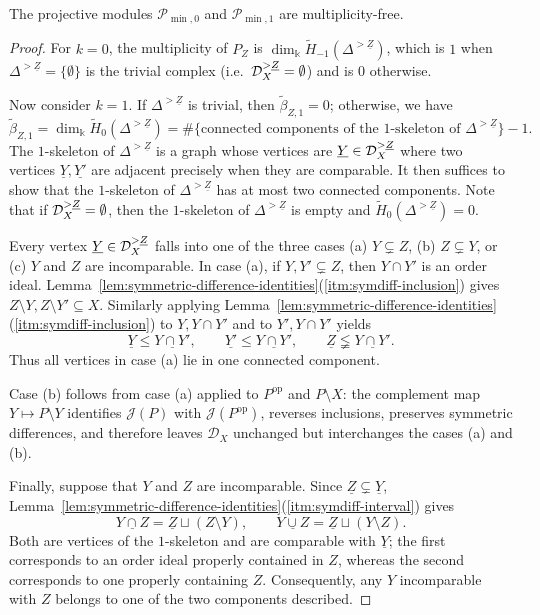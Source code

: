 \documentclass[a4paper,leqno]{amsart}
\begin{document}
\begin{prop}\label{prop:low-degree-multiplicity}
The projective modules $\mathcal P_{\min,0}$ and $\mathcal P_{\min,1}$ are multiplicity-free.
\end{prop}

\begin{proof}
For $k=0$, the multiplicity of $P_Z$ is $\dim_{\Bbbk}\widetilde H_{-1}(\Delta^{>\underline{Z}})$, which is $1$ when $\Delta^{>\underline{Z}}=\{\emptyset\}$ is the trivial complex (i.e.\ $\mathcal D_X^{>\underline{Z}}=\emptyset$) and is $0$ otherwise.

Now consider $k=1$. If $\Delta^{>\underline{Z}}$ is trivial, then $\widetilde\beta_{Z,1}=0$; otherwise, we have
\begin{equation*}
 \widetilde\beta_{Z,1}
 =\dim_{\Bbbk}\widetilde H_0(\Delta^{>\underline{Z}})
 =\#\{\text{connected components of the $1$-skeleton of }\Delta^{>\underline{Z}}\}-1.
\end{equation*}
The $1$-skeleton of $\Delta^{>\underline{Z}}$ is a graph whose vertices are $\underline{Y}\in\mathcal D_X^{>\underline{Z}}$ where two vertices $\underline{Y},\underline{Y'}$ are adjacent precisely when they are comparable. It then suffices to show that the $1$-skeleton of $\Delta^{>\underline{Z}}$ has at most two connected components. Note that if $\mathcal D_X^{>\underline{Z}}=\emptyset$, then the $1$-skeleton of $\Delta^{>\underline{Z}}$ is empty and $\widetilde H_0(\Delta^{>\underline{Z}})=0$.

Every vertex $\underline{Y}\in \mathcal D_X^{>\underline{Z}}$ falls into one of the three cases (a) $Y\subsetneq Z$, (b) $Z\subsetneq Y$, or (c) $Y$ and $Z$ are incomparable.  In case (a), if $Y,Y'\subsetneq Z$, then $Y\cap Y'$ is an order ideal. Lemma~\ref{lem:symmetric-difference-identities}\textup{(\ref{itm:symdiff-inclusion})} gives $Z\setminus Y,Z\setminus Y'\subseteq X$. Similarly applying Lemma~\ref{lem:symmetric-difference-identities}\textup{(\ref{itm:symdiff-inclusion})} to $Y,Y\cap Y'$ and to $Y',Y\cap Y'$ yields
\[
 \underline{Y}\le \underline{Y\cap Y'},\qquad
 \underline{Y'}\le \underline{Y\cap Y'},\qquad
 \underline{Z}\lneqq \underline{Y\cap Y'}.
\]
Thus all vertices in case (a) lie in one connected component.

Case (b) follows from case (a) applied to $P^{\mathrm{op}}$ and $P\setminus X$: the complement map $Y\mapsto P\setminus Y$ identifies $\mathcal J(P)$ with $\mathcal J(P^{\mathrm{op}})$, reverses inclusions, preserves symmetric differences, and therefore leaves $\mathcal D_X$ unchanged but interchanges the cases (a) and (b).

Finally, suppose that $Y$ and $Z$ are incomparable. Since $\underline{Z}\subsetneq\underline{Y}$, Lemma~\ref{lem:symmetric-difference-identities}\textup{(\ref{itm:symdiff-interval})} gives
\[
 \underline{Y\cap Z}=\underline{Z}\sqcup(Z\setminus Y),\qquad
 \underline{Y\cup Z}=\underline{Z}\sqcup(Y\setminus Z).
\]
Both are vertices of the $1$-skeleton and are comparable with $\underline{Y}$; the first corresponds to an order ideal properly contained in $Z$, whereas the second corresponds to one properly containing $Z$.  Consequently, any $Y$ incomparable with $Z$ belongs to one of the two components described.
\end{proof}
\end{document}
